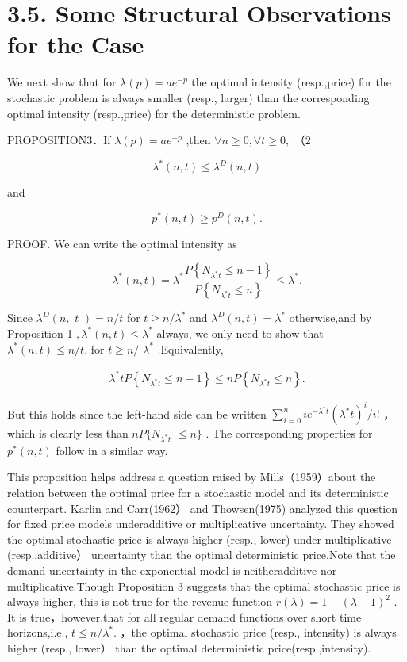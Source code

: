 \section{3.5. Some Structural Observations for the
Case}\label{some-structural-observations-for-the-case}

We next show that for \(\lambda ( p ) = a e ^ { - p }\) the optimal
intensity (resp.,price) for the stochastic problem is always smaller
(resp., larger) than the corresponding optimal intensity (resp.,price)
for the deterministic problem.

PROPOSITION3．If \(\lambda ( p ) = a e ^ { - p }\) ,then
\(\forall n \geq 0 , \forall t \geq 0 ,\) （2

\[
\lambda ^ { * } ( n , t ) \leq \lambda ^ { D } ( n , t )
\]

and

\[
p ^ { * } ( n , t ) \geq p ^ { D } ( n , t ) .
\]

PROOF. We can write the optimal intensity as

\[
\lambda ^ { * } ( n , t ) = \lambda ^ { * } \frac { P \left\{ N _ { \lambda ^ { * } t } \leq n - 1 \right\} } { P \left\{ N _ { \lambda ^ { * } t } \leq n \right\} } \leq \lambda ^ { * } .
\]

Since \(\lambda ^ { D } ( n , \textit { t } ) = n / t\) for
\(t \geq n / \lambda ^ { * }\) and
\({ \lambda } ^ { D } ( n ,  t ) = { \lambda } ^ { * }\) otherwise,and
by Proposition 1 \(, \lambda ^ { * } ( n , t ) \leq \lambda ^ { * }\)
always, we only need to show that
\(\lambda ^ { * } ( n , t ) \leq n / t .\) for \(t \geq n /\)
\(\lambda ^ { * }\) .Equivalently,

\[
\begin{array} { r } { \lambda ^ { * } t P \left\{ N _ { \lambda ^ { * } t } \leq n - 1 \right\} \leq n P \left\{ N _ { \lambda ^ { * } t } \leq n \right\} . } \end{array}
\]

But this holds since the left-hand side can be written
\(\textstyle \sum _ { i = 0 } ^ { n } i e ^ { - \lambda ^ { * } t } ( \lambda ^ { * } t ) ^ { i } / i !\)
，which is clearly less than \(n P \{ N _ { \lambda ^ { * } t }\)
\(\leq n \}\) . The corresponding properties for \(p ^ { * } ( n , t )\)
follow in a similar way.

This proposition helps address a question raised by Mills（1959）about
the relation between the optimal price for a stochastic model and its
deterministic counterpart. Karlin and Carr(1962） and Thowsen(1975)
analyzed this question for fixed price models underadditive or
multiplicative uncertainty. They showed the optimal stochastic price is
always higher (resp., lower) under multiplicative (resp.,additive）
uncertainty than the optimal deterministic price.Note that the demand
uncertainty in the exponential model is neitheradditive nor
multiplicative.Though Proposition 3 suggests that the optimal stochastic
price is always higher, this is not true for the revenue function
\(r ( \lambda ) = 1 - ( \lambda - 1 ) ^ { 2 }\) . It is
true，however,that for all regular demand functions over short time
horizons,i.e., \(t \leq n / \lambda ^ { * } .\) ，the optimal stochastic
price (resp., intensity) is always higher (resp., lower） than the
optimal deterministic price(resp.,intensity).

